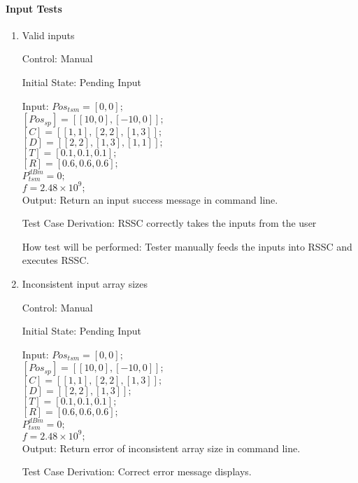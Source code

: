 \documentclass[12pt, titlepage]{article}
\begin{document}
\paragraph{Input Tests}

\begin{enumerate}

\item{Valid inputs\\}

Control: Manual
					
Initial State: Pending Input
					
Input:
$Pos_{tsm} = [0,0];$\\
$[Pos_{sp}] = [[10,0],[-10,0]];$\\
$[C] = [[1,1],[2,2],[1,3]];$\\
$[D] = [[2,2],[1,3],[1,1]];$\\
$[T] = [0.1,0.1,0.1];$\\
$[R] = [0.6,0.6,0.6];$\\
$P_{tsm}^{dBm} = 0;$\\
$f = 2.48\times10^{9};$\\

Output: Return an input success message in command line.

Test Case Derivation: RSSC correctly takes the inputs from the user
					
How test will be performed: Tester manually feeds the inputs into
RSSC and executes RSSC.
					
					
\item{Inconsistent input array sizes\\}

Control: Manual
					
Initial State: Pending Input
					
Input: 
$Pos_{tsm} = [0,0];$\\
$[Pos_{sp}] = [[10,0],[-10,0]];$\\
$[C] = [[1,1],[2,2],[1,3]];$\\
$[D] = [[2,2],[1,3]];$\\
$[T] = [0.1,0.1,0.1];$\\
$[R] = [0.6,0.6,0.6];$\\
$P_{tsm}^{dBm} = 0;$\\
$f = 2.48\times10^{9};$\\
					
Output: Return error of inconsistent array size in command line.

Test Case Derivation: Correct error message displays.


\end{enumerate}
\end{document}
